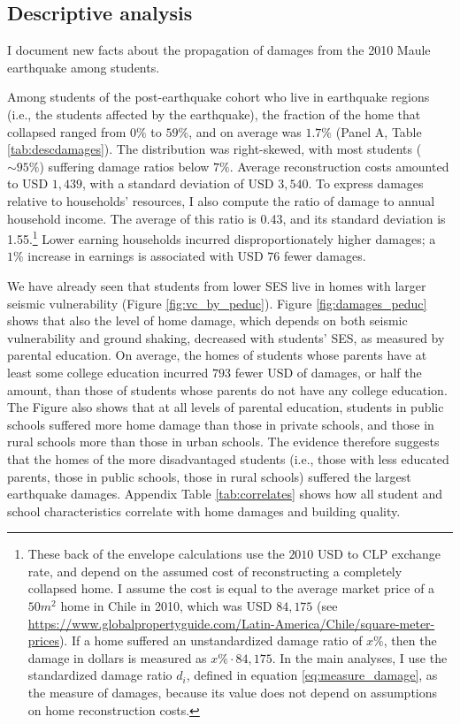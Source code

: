  

 

\subsection{Descriptive analysis}\label{sec:descrptive}


I document new facts about the propagation of damages from the 2010 Maule earthquake among students.\par 

Among students of the post-earthquake cohort who live in earthquake regions (i.e., the students affected by the earthquake), the fraction of the home that collapsed ranged from $0\%$ to $59\%$, and on average was $1.7\%$ (Panel A, Table \ref{tab:descdamages}). The distribution was right-skewed, with most students ($\sim 95\%$) suffering damage ratios below $7\%$. Average reconstruction costs amounted to USD $1,439$, with a standard deviation of USD $3,540$. To express damages relative to households' resources, I also compute the ratio of damage to annual household income. The average of this ratio is 0.43, and its standard deviation is 1.55.\footnote{These back of the envelope calculations use the $2010$ USD to CLP exchange rate, and depend on the assumed cost of reconstructing a completely collapsed home. I assume the cost is equal to the average market price of a $50m^2$ home in Chile in 2010, which was USD $84,175$ (see \url{https://www.globalpropertyguide.com/Latin-America/Chile/square-meter-prices}). If a home suffered an unstandardized damage ratio of $x\%$, then the damage in dollars is measured as $x\% \cdot 84,175$. In the main analyses, I use the standardized damage ratio $d_i$, defined in equation \eqref{eq:measure_damage}, as the measure of damages, because its value does not depend on assumptions on home reconstruction costs.} Lower earning households incurred disproportionately higher damages; a $1\%$ increase in earnings is associated with USD $76$ fewer damages. \par 


We have already seen that students from lower SES live in homes with larger seismic vulnerability (Figure \ref{fig:vc_by_peduc}). Figure \ref{fig:damages_peduc} shows that also the level of home damage, which depends on both seismic vulnerability and ground shaking, decreased with students' SES, as measured by parental education. On average, the homes of students whose parents have at least some college education incurred $793$ fewer USD of damages, or half the amount, than those of students whose parents do not have any college education. The Figure also shows that at all levels of parental education, students in public schools suffered more home damage than those in private schools, and those in rural schools more than those in urban schools. The evidence therefore suggests that the homes of the more disadvantaged students (i.e., those with less educated parents, those in public schools, those in rural schools) suffered the largest earthquake damages. Appendix Table \ref{tab:correlates} shows how all student and school characteristics correlate with home damages and building quality. \par 



